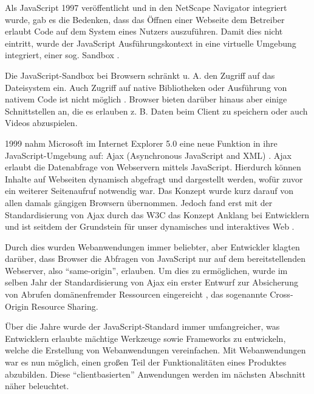 
Als JavaScript 1997 veröffentlicht und in den NetScape Navigator integriert wurde, gab es die Bedenken, dass das Öffnen einer Webseite dem Betreiber erlaubt Code auf dem System eines Nutzers auszuführen. Damit dies nicht eintritt, wurde der JavaScript Ausführungskontext in eine virtuelle Umgebung integriert, einer sog. Sandbox \cite{LearningJavaScript}.

Die JavaScript-Sandbox bei Browsern schränkt u. A. den Zugriff auf das Dateisystem ein. Auch Zugriff auf native Bibliotheken oder Ausführung von nativem Code ist nicht möglich \cite{TheSpyInTheSandbox}. Browser bieten darüber hinaus aber einige Schnittstellen an, die es erlauben z. B. Daten beim Client zu speichern oder auch Videos abzuspielen.


1999 nahm Microsoft im Internet Explorer 5.0 eine neue Funktion in ihre JavaScript-Umgebung auf: Ajax (Asynchronous JavaScript and XML) \cite{MDNAjax}. Ajax erlaubt die Datenabfrage von Webservern mittels JavaScript. Hierdurch können Inhalte auf Webseiten dynamisch abgefragt und dargestellt werden, wofür zuvor ein weiterer Seitenaufruf notwendig war. Das Konzept wurde kurz darauf von allen damals gängigen Browsern übernommen. Jedoch fand erst mit der Standardisierung von Ajax durch das W3C \cite{TheXMLHttpRequestObject} das Konzept Anklang bei Entwicklern \cite{AngularForEnterpriseReadyWebApplications} \cite{FinkIntroducingSPAs} und ist seitdem der Grundstein für unser dynamisches und interaktives Web \cite{ResearchOnAJAXTechnology}.

Durch dies wurden Webanwendungen immer beliebter, aber Entwickler klagten darüber, dass Browser die Abfragen von JavaScript nur auf dem bereitstellenden Webserver, also \enquote{same-origin}, erlauben\cite{CrossSiteXHRWithCORS}. Um dies zu ermöglichen, wurde im selben Jahr der Standardisierung von Ajax ein erster Entwurf zur Absicherung von Abrufen domänenfremder Ressourcen eingereicht \cite{AuthorizingCORS}, das sogenannte Cross-Origin Resource Sharing.

Über die Jahre wurde der JavaScript-Standard immer umfangreicher, was Entwicklern erlaubte mächtige Werkzeuge sowie Frameworks zu entwickeln, welche die Erstellung von Webanwendungen vereinfachen. Mit Webanwendungen war es nun möglich, einen großen Teil der Funktionalitäten eines Produktes abzubilden. Diese \enquote{clientbasierten} Anwendungen werden im nächsten Abschnitt näher beleuchtet.

